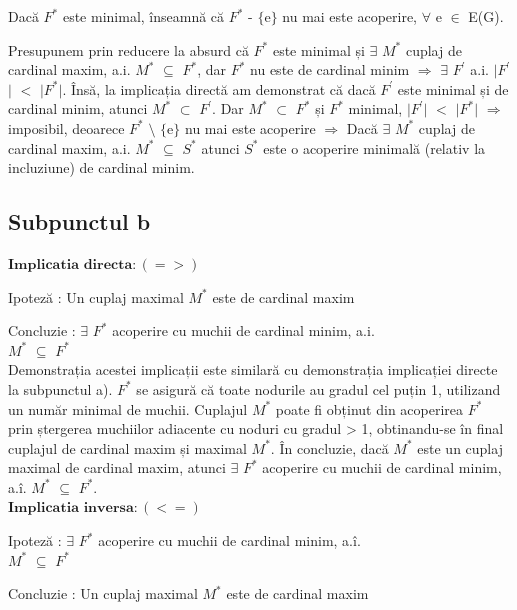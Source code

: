 \documentclass{article}
\begin{document}
{Dacă $F^*$ este minimal, înseamnă că $F^*$ - $\lbrace$e$\rbrace$ nu mai este acoperire, $\forall$ e $\in$ E(G). 

Presupunem prin reducere la absurd că $F^*$ este minimal și $\exists$ $M^*$ cuplaj de cardinal maxim, a.i. $M^*$ $\subseteq$ $F^*$, dar $F^*$ nu este de cardinal minim $\Rightarrow$ $\exists$ $F^{'}$ a.i. $\vert$$F^{'}$$\vert$ $<$ $\vert$$F^*$$\vert$. Însă, la implicația directă am demonstrat că dacă $F^{'}$ este minimal și de cardinal minim, atunci $M^*$ $\subset$ $F^{'}$. Dar $M^*$ $\subset$ $F^*$ și $F^*$ minimal, $\vert$$F^{'}$$\vert$ $<$ $\vert$$F^*$$\vert$ $\Rightarrow$ imposibil, deoarece $F^*$ $\setminus$ $\lbrace$e$\rbrace$  nu mai este acoperire $\Rightarrow$ Dacă $\exists$ $M^*$ cuplaj de cardinal maxim, a.i. $M^*$ $\subseteq$ $S^*$ atunci $S^*$ este o acoperire minimală (relativ la incluziune) de cardinal minim.  


\subsection*{\fontsize{16}{30}\selectfont Subpunctul b}
{\fontsize{14}{16}\selectfont 
$\mathbf{Implicatia}$ $\mathbf{directa: (=>)}$ 
\\
\par Ipoteză : Un cuplaj maximal $M^*$ este de cardinal maxim
\par Concluzie : $\exists$ $F^*$ acoperire cu muchii de cardinal minim, a.i. \\ $M^*$ $\subseteq$ $F^*$ 
\\



Demonstrația acestei implicații este similară cu demonstrația implicației directe la subpunctul a). $F^*$ se asigură că toate nodurile au gradul cel puțin 1, utilizand un număr minimal de muchii. Cuplajul $M^*$ poate fi obținut din acoperirea $F^*$ prin ștergerea muchiilor adiacente cu noduri cu gradul > 1, obtinandu-se în final cuplajul de cardinal maxim și maximal $M^*$. În concluzie, dacă $M^*$ este un cuplaj maximal de cardinal maxim, atunci $\exists$ $F^*$ acoperire cu muchii de cardinal minim, a.î. $M^*$ $\subseteq$ $F^*$. \\

$\mathbf{Implicatia}$ $\mathbf{inversa: (<=)}$ 
\\
\par Ipoteză : $\exists$ $F^*$ acoperire cu muchii de cardinal minim, a.î. \\ $M^*$ $\subseteq$ $F^*$ 
\par Concluzie : Un cuplaj maximal $M^*$ este de cardinal maxim
\\

}}
\end{document}
